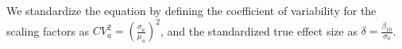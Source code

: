 We standardize the equation by defining the coefficient of variability for the scaling factors as $CV_{a}^2 = ({\frac{\sigma_{a}}{\mu_{a}}})^2$, and the standardized true effect size as $\delta = \frac{\beta_{10}}{\sigma_0}$.